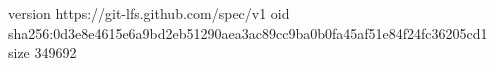 version https://git-lfs.github.com/spec/v1
oid sha256:0d3e8e4615e6a9bd2eb51290aea3ac89cc9ba0b0fa45af51e84f24fc36205cd1
size 349692
